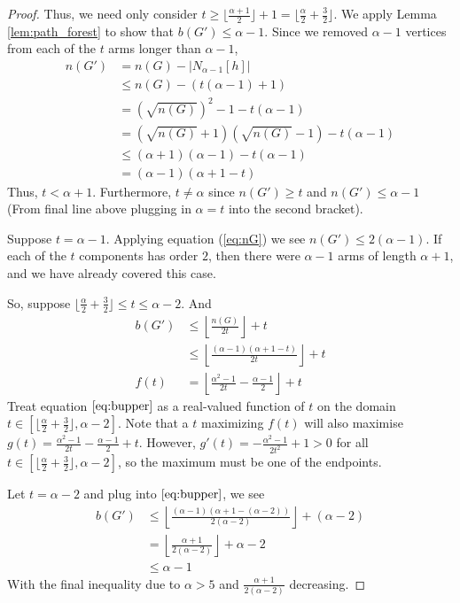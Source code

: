 \documentclass[12pt]{article}
\begin{document}
\begin{proof}
    Thus, we need only consider $t \geq \lfloor \frac{\alpha + 1}{2} \rfloor + 1 = \lfloor \frac{\alpha}{2} + \frac{3}{2} \rfloor$. 
    We apply Lemma \ref{lem:path_forest} to show that $b(G') \leq \alpha - 1$.
    Since we removed $\alpha - 1$ vertices from each of the $t$ arms longer than $\alpha - 1$,
    \begin{align}
        n(G') &= n(G) - |N_{\alpha - 1}[h]| \nonumber \\
        &\leq n(G) - \left(t(\alpha - 1) + 1\right) \nonumber \\
        &= \left(\sqrt{n(G)}\right)^2 - 1 - t(\alpha - 1) \nonumber \\
        &= (\sqrt{n(G)} + 1)(\sqrt{n(G)} - 1) - t(\alpha - 1) \nonumber \\
        &\leq (\alpha + 1)(\alpha - 1) - t(\alpha - 1) \nonumber \\
        &= (\alpha - 1)(\alpha + 1 - t) \label{eq:nG}
    \end{align}
    Thus, $t < \alpha + 1$.
    Furthermore, $t \neq \alpha$ since $n(G') \geq t$ and $n(G') \leq \alpha - 1$ (From final line above plugging in $\alpha = t$ into the second bracket).

    Suppose $t = \alpha-1$.
    Applying equation (\ref{eq:nG}) we see $n(G') \leq 2(\alpha-1)$.
    If each of the $t$ components has order $2$, then there were $\alpha - 1$ arms of length $\alpha + 1$, and we have already covered this case.

    So, suppose $\lfloor \frac{\alpha}{2} + \frac{3}{2} \rfloor \leq t \leq \alpha - 2$.
    And 
    \begin{align}
        b(G') &\leq \left\lfloor \frac{n(G)}{2t} \right\rfloor + t \nonumber \\
        &\leq \left\lfloor \frac{(\alpha - 1)(\alpha + 1 - t)}{2t} \right\rfloor + t \nonumber\\
        f(t) &= \left\lfloor \frac{\alpha^2 - 1}{2t} - \frac{\alpha - 1}{2} \right\rfloor + t \label{eq:bupper}
    \end{align}
    Treat equation $\ref{eq:bupper}$ as a real-valued function of $t$ on the domain $t \in [\lfloor \frac{\alpha}{2} + \frac{3}{2} \rfloor, \alpha - 2]$.
    Note that a $t$ maximizing $f(t)$ will also maximise $g(t) = \frac{\alpha^2 - 1}{2t} - \frac{\alpha - 1}{2} + t$.
    However, $g'(t) = -\frac{\alpha^2 - 1}{2t^2} + 1 > 0$ for all $t \in [\lfloor \frac{\alpha}{2} + \frac{3}{2} \rfloor, \alpha - 2]$, so the maximum must be one of the endpoints.

    Let $t = \alpha - 2$ and plug into $\ref{eq:bupper}$, we see
    \begin{align*}
        b(G') &\leq \left\lfloor \frac{(\alpha - 1)(\alpha + 1 - (\alpha - 2))}{2(\alpha - 2)} \right\rfloor + (\alpha - 2)\\
        &= \left\lfloor \frac{\alpha + 1}{2(\alpha - 2)} \right\rfloor + \alpha - 2\\
        &\leq \alpha - 1
    \end{align*}
    With the final inequality due to $\alpha > 5$ and $\frac{\alpha + 1}{2(\alpha - 2)}$ decreasing. 
    

\end{proof}
\end{document}
